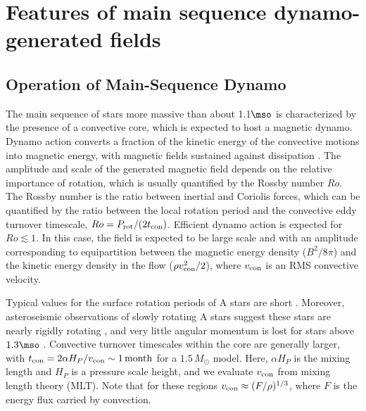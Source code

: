 \section{Features of main sequence dynamo-generated fields}

\subsection{Operation of Main-Sequence Dynamo}\label{msdynamo}

The main sequence of stars more massive than about 1.1$\mso$ is characterized by the presence of a convective core,
which is expected to host a magnetic dynamo. Dynamo action converts a fraction of the kinetic energy 
of the convective motions into magnetic energy, with magnetic fields sustained against dissipation  \citep[see e.g.,][]{Brandenburg_2005}. The amplitude and scale of the generated magnetic field depends on the relative importance of rotation, which is usually quantified by the Rossby number $Ro$. The Rossby number is the ratio between inertial and Coriolis forces, which can be quantified by the ratio between the local rotation period and the convective eddy turnover timescale, $Ro = P_{\rm rot}/(2 t_{\rm con})$. 
Efficient dynamo action is expected for $Ro \lesssim 1$. In this case, the field is expected to be large scale and with an amplitude corresponding to equipartition between the magnetic energy density ($B^2/8\pi$) and the kinetic energy density in the flow ($\rho v^2_{\rm con}/2$), where $v_{\rm con}$ is an RMS convective velocity.

Typical values for the surface rotation periods of A stars are short \citep[about 1 day, see e.g.]{Zorec_2012}. 
Moreover, asteroseismic observations of slowly rotating A stars suggest these stars are nearly rigidly rotating \cite{Kurtz_2014}, and very little angular momentum is lost for stars above $1.3\mso$ \citep[Kraft break, see e.g.][]{1967ApJ...150..551K,2013ApJ...776...67V}. 
Convective turnover timescales within the core are generally larger, with $t_{\rm con} = 2 \alpha H_P/v_{\rm con} \sim 1 \, {\rm month}$ for a $1.5 \, M_\odot$ model. Here, $\alpha H_P$ is the mixing length and $H_P$ is a pressure scale height, and we evaluate $v_{\rm con}$ from mixing length theory (MLT). Note that for these regions $v_{\rm con} \approx (F/\rho)^{1/3}$, where $F$ is the energy flux carried by convection.

